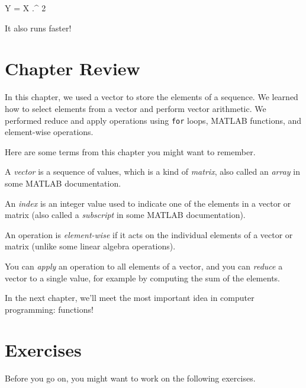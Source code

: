 \documentclass[../../book.tex]{subfiles}
\begin{document}
\begin{code}
Y = X .^ 2
\end{code}

It also runs faster!


\section{Chapter Review}

In this chapter, we used a vector to store the elements of a sequence.  We learned how to select elements from a vector and perform vector arithmetic.  We performed reduce and apply operations using \lstinline{for} loops, MATLAB functions, and element-wise operations.

Here are some terms from this chapter you might want to remember.


A \emph{vector} is a sequence of values, which is a kind of \emph{matrix}, also called an \emph{array} in some MATLAB documentation.

An \emph{index} is an integer value used to indicate one of the elements
in a vector or matrix (also called a \emph{subscript} in some MATLAB documentation).

An operation is \emph{element-wise} if it acts on the individual elements of a vector or matrix (unlike some linear algebra operations).

You can \emph{apply} an operation to all elements of a vector, and you can \mbox{\emph{reduce}} a vector to a single value, for example by computing the sum of the elements.


In the next chapter, we'll meet the most important idea in computer programming: functions!



\section{Exercises}

Before you go on, you might want to work on the following exercises.
\end{document}
